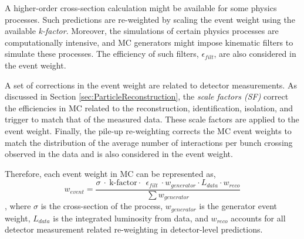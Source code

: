 A higher-order cross-section calculation might be available for some physics processes. Such predictions are re-weighted by scaling the event weight using the available \textit{k-factor}. Moreover, the simulations of certain physics processes are computationally intensive, and MC generators might impose kinematic filters to simulate these processes. The efficiency of such filters, $\epsilon_{filt}$, are also considered in the event weight. 

A set of corrections in the event weight are related to detector measurements. As discussed in Section \ref{sec:ParticleReconstruction}, the \textit{scale factors (SF)} correct the efficiencies in MC related to the reconstruction, identification, isolation, and trigger to match that of the measured data. These scale factors are applied to the event weight. Finally, the pile-up re-weighting corrects the MC event weights to match the distribution of the average number of interactions per bunch crossing observed in the data and is also considered in the event weight.

Therefore, each event weight in MC can be represented as, 
\begin{equation}
w_{event} = \frac{\sigma~\cdot~\text{k-factor}\cdot~~\epsilon_{filt}~\cdot w_{generator} \cdot {L_{data} \cdot w_{reco}}}{\sum{w_{generator}}}
\label{eqn:EventWeight}
\end{equation}, 
where $\sigma$ is the cross-section of the process, $w_{generator}$ is the generator event weight, $L_{data}$ is the integrated luminosity from data, and $w_{reco}$ accounts for all detector measurement related re-weighting in detector-level predictions.